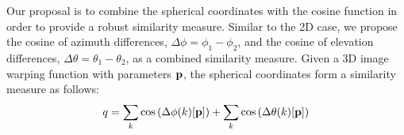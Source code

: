 Our proposal is to combine the spherical coordinates with the cosine function in
order to provide a robust similarity measure. Similar to the 2D case, we
propose the cosine of azimuth differences, $\Delta \phi = \phi_1 - \phi_2$, and
the cosine of elevation differences, $\Delta \theta = \theta_1 - \theta_2$, as a
combined similarity measure. Given a 3D image warping function with parameters
$\boldsymbol{\mathbf{p}}$, the spherical coordinates form a similarity measure as follows:
\begin{equation}\label{eq:spherical_similarity_measure}
    q = \sum_k \cos \left(\Delta \phi(k)[\boldsymbol{\mathbf{p}}]\right) + \sum_k \cos \left(\Delta \theta(k)[\boldsymbol{\mathbf{p}}]\right)
\end{equation}
